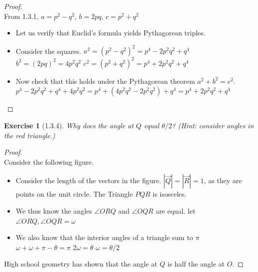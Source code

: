\documentclass[10pt]{article}
\theoremstyle{plain}
\newtheorem{ex}{Exercise}
\begin{document}
\begin{proof}
  \ \\
  From 1.3.1, $a=p^{2}-q^{2}$, $b=2pq$, $c=p^2+q^{2}$
  \begin{itemize}
    \item Let us verify that Euclid's formula yields Pythagorean triples.
    \item Consider the squares.
    \subitem $a^{2}=(p^{2}-q^{2})^{2}=p^{4}-2p^{2}q^{2}+q^{4}$
    \subitem $b^{2}=(2pq)^{2}=4p^{2}q^{2}$
    \subitem $c^{2}=(p^2+q^{2})^{2}=p^{4}+2p^{2}q^{2}+q^{4}$
    \item Now check that this holds under the Pythagorean theorem $a^{2}+b^{2}=c^{2}$.
    \subitem $p^{4}-2p^{2}q^{2}+q^{4}+4p^{2}q^{2}=p^{4}+(4p^{2}q^{2}-2p^{2}q^{2})+q^{4}=p^{4}+2p^{2}q^{2}+q^{4}$
  \end{itemize}
\end{proof}

\hrulefill

\begin{ex} [1.3.4]
  Why does the angle at $Q$ equal $\theta/2$? (Hint: consider angles in the red triangle.)
\end{ex}

\begin{proof}
  \ \\
  Consider the following figure. \\
  \begin{center}
  \end{center}
  \begin{itemize}
    \item Consider the length of the vectors in the figure.
    \subitem $|\overrightarrow{Q}| = |\overrightarrow{R}| = 1 $, as they are points on the unit circle.
    \subitem The Triangle $PQR$ is isosceles.
    \item We thus know the angles $\angle ORQ$ and $\angle OQR$ are equal.
    \subitem let $\angle ORQ, \angle OQR = \omega $
    \item We also know that the interior angles of a triangle sum to $\pi$
    \subitem $\omega + \omega + \pi - \theta = \pi$
    \subitem $2\omega = \theta$
    \subitem $\omega = \theta/2$
  \end{itemize}
  High school geometry has shown that the angle at $Q$ is half the angle at $O$.
\end{proof}
\end{document}
